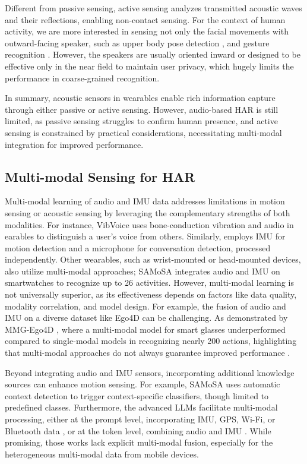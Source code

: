 Different from passive sensing, active sensing analyzes transmitted acoustic waves and their reflections, enabling non-contact sensing.
For the context of human activity, we are more interested in 
sensing not only the facial movements \citep{dong2024rehearsse} with outward-facing speaker, such as upper body pose detection \citep{mahmud2023posesonic}, and gesture recognition \citep{yang2024maf}. However, the speakers are usually oriented inward or designed to be effective only in the near field to maintain user privacy, which hugely limits the performance in coarse-grained recognition. 

In summary, acoustic sensors in wearables enable rich information capture through either passive or active sensing. However, audio-based HAR is still limited, as passive sensing struggles to confirm human presence, and active sensing is constrained by practical considerations, necessitating multi-modal integration for improved performance.

\subsection{Multi-modal Sensing for HAR}
Multi-modal learning of audio and IMU data addresses limitations in motion sensing or acoustic sensing by leveraging the complementary strengths of both modalities. For instance, VibVoice \citep{he2023towards} uses bone-conduction vibration and audio in earables to distinguish a user’s voice from others. Similarly, \citep{min2018exploring} employs IMU for motion detection and a microphone for conversation detection, processed independently. Other wearables, such as wrist-mounted or head-mounted devices, also utilize multi-modal approaches; SAMoSA \citep{mollyn2022samosa, bhattacharya2022leveraging} integrates audio and IMU on smartwatches to recognize up to 26 activities. However, multi-modal learning is not universally superior, as its effectiveness depends on factors like data quality, modality correlation, and model design. 
For example, the fusion of audio and IMU on a diverse dataset like Ego4D \citep{grauman2022ego4d} can be challenging.
As demonstrated by MMG-Ego4D \citep{gong2023mmg}, where a multi-modal model for smart glasses underperformed compared to single-modal models in recognizing nearly 200 actions, highlighting that multi-modal approaches do not always guarantee improved performance \citep{huang2022modality}.

Beyond integrating audio and IMU sensors, incorporating additional knowledge sources can enhance motion sensing. For example, SAMoSA \citep{mollyn2022samosa} uses automatic context detection to trigger context-specific classifiers, though limited to predefined classes. Furthermore, the advanced LLMs facilitate multi-modal processing, either at the prompt level, incorporating IMU, GPS, Wi-Fi, or Bluetooth data \citep{yang2025contextagent, xu2024autolife,yang2024drhouse}, or at the token level, combining audio and IMU \citep{han2023onellm, girdhar2023imagebind}. While promising, those works lack explicit multi-modal fusion, especially for the heterogeneous multi-modal data from mobile devices.

